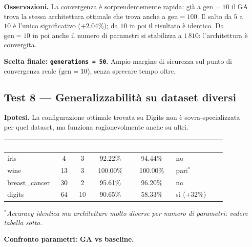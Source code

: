 \documentclass[11pt,a4paper]{article}
\newcommand{\fnt}{\texttt}     %
\begin{document}
\textbf{Osservazioni.}
La convergenza è sorprendentemente rapida: già a $\text{gen} = 10$ il GA
trova la stessa architettura ottimale che trova anche a $\text{gen} = 100$.
Il salto da $5$ a $10$ è l'unico significativo ($+2.04\%$); da $10$ in poi
il risultato è identico. Da $\text{gen}=10$ in poi anche il numero di
parametri si stabilizza a $1\,810$: l'architettura è convergita.

\textbf{Scelta finale: \fnt{generations = 50}.} Ampio margine di sicurezza
sul punto di convergenza reale ($\text{gen}=10$), senza sprecare tempo
oltre.

\subsection{Test 8 — Generalizzabilità su dataset diversi}

\textbf{Ipotesi.} La configurazione ottimale trovata su Digits non è
sovra-specializzata per quel dataset, ma funziona ragionevolmente anche
su altri.

\begin{center}
\begin{tabular}{lccccl}
    \toprule
    \rowcolor{headerblue}
    \textcolor{white}{\textbf{dataset}} &
    \textcolor{white}{\textbf{feat.}} &
    \textcolor{white}{\textbf{cl.}} &
    \textcolor{white}{\textbf{GA test\%}} &
    \textcolor{white}{\textbf{Baseline\%}} &
    \textcolor{white}{\textbf{vince (acc.)?}} \\
    \midrule
    iris           &  4 &  3 & 92.22\%   & 94.44\%   & no         \\
    \rowcolor{rowgray}
    wine           & 13 &  3 & 100.00\%  & 100.00\%  & pari$^*$   \\
    breast\_cancer & 30 &  2 & 95.61\%   & 96.20\%   & no         \\
    \rowcolor{rowgray}
    digits         & 64 & 10 & 90.65\%   & 58.33\%   & sì (+32\%) \\
    \bottomrule
\end{tabular}
\end{center}

$^*$\textit{Accuracy identica ma architetture molto diverse per numero di parametri: vedere tabella sotto.}

\medskip
\textbf{Confronto parametri: GA vs baseline.}
\end{document}
